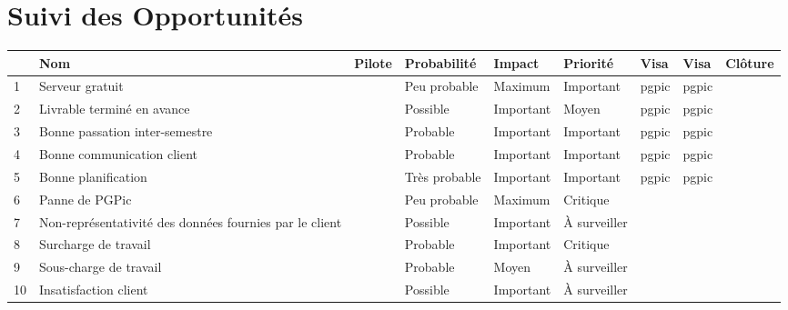 \documentclass[asi]{picINSA}
\begin{document}
\chapter*{Suivi des Opportunités}

\begin{longtable}{|p{0.3cm}|p{2.5cm}|p{1.5cm}|p{2cm}|p{1.8cm}|p{1.5cm}|p{1cm}|p{1cm}|p{1.5cm}|}
			\hline
			\rowcolor{gray!40}
			\No & Nom & Pilote & Probabilité & Impact & Priorité & Visa \RQCourt{} & Visa \CPCourt{} & Clôture \\\hline
			 1 & Serveur gratuit &  & Peu probable & Maximum & Important & pgpic & pgpic & \\\hline
			 2 & Livrable terminé en avance &  & Possible & Important & Moyen & pgpic & pgpic & \\\hline
			 3 & Bonne passation inter-semestre &  & Probable & Important & Important & pgpic & pgpic & \\\hline
			 4 & Bonne communication client &  & Probable & Important & Important & pgpic & pgpic & \\\hline
			 5 & Bonne planification &  & Très probable & Important & Important & pgpic & pgpic & \\\hline
			 
			 
			 
			 
			 
			 
			 6 & Panne de PGPic &  & Peu probable & Maximum & Critique & & & \\\hline
			 7 & Non-représentativité des données fournies par le client &  & Possible & Important & À surveiller & & & \\\hline
			 8 & Surcharge de travail &  & Probable & Important & Critique & & & \\\hline
			 9 & Sous-charge de travail &  & Probable & Moyen & À surveiller & & & \\\hline
			 10 & Insatisfaction client &  & Possible & Important & À surveiller & & & \\\hline
\end{longtable}
\end{document}
